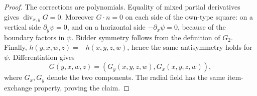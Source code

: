 \begin{proof}
The corrections are polynomials.  Equality of mixed partial derivatives gives
\(\operatorname{div}_{x,y}G=0\).  Moreover \(G\cdot n=0\) on each side of
the own-type square: on a vertical side \(\partial_y\psi=0\), and on a
horizontal side \(-\partial_x\psi=0\), because of the boundary factors in
\(\psi\).  Bidder symmetry follows from the definition of \(G_2\).  Finally,
\(h(y,x,w,z)=-h(x,y,z,w)\), hence the same antisymmetry holds for \(\psi\).
Differentiation gives
\[
G(y,x,w,z)=(G_y(x,y,z,w),G_x(x,y,z,w)),
\]
where \(G_x,G_y\) denote the two components.  The radial field has the same
item-exchange property, proving the claim.
\end{proof}
